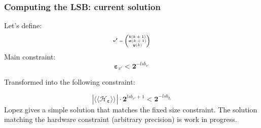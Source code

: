 \begin{frame}
	\frametitle{Computing the LSB: current solution}
	Let's define:%
			\begin{equation}
				\tiny
				\boldsymbol{v'}=
				\begin{pmatrix}
					\boldsymbol{t}(k+1) \\
					\boldsymbol{x}(k+1) \\
					\boldsymbol{y}(k)   \\
				\end{pmatrix}
			\end{equation}
	Main constraint:
		\begin{equation} \label{constraint}
			\boldsymbol{\varepsilon}_{v'} < \boldsymbol{2}^{-lsb_{v'}}
		\end{equation}

	Transformed into the following constraint:

		\begin{equation} \label{constraint}
			| \langle\langle \mathcal{H}_{\boldsymbol{\varepsilon}} \rangle\rangle_{} | \cdot \boldsymbol{2}^{lsb_{v'}+1} < \boldsymbol{2}^{-lsb_{y_i}}
		\end{equation}
	Lopez gives a simple solution that matches the fixed size constraint.
	The solution matching the hardware constraint (arbitrary precision) is work in progress.

\end{frame}

